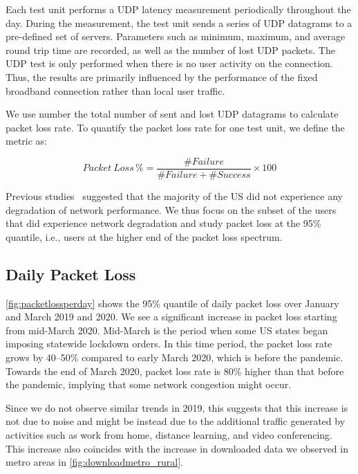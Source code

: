 Each test unit performs a \gls{UDP} latency measurement periodically throughout the day. During the measurement, the test unit sends a series of \gls{UDP} datagrams to a pre-defined set of servers. Parameters such as minimum, maximum, and average round  trip time are recorded, as well as the number of lost \gls{UDP} packets. The \gls{UDP} test is only performed when there is no user activity on the connection. Thus, the results are primarily influenced by the performance of the fixed broadband connection rather than local user traffic.

We use number the total number of sent and lost \gls{UDP} datagrams to calculate packet loss rate. To quantify the packet loss rate for one test unit, we define the metric as:

\begin{equation}
    Packet \ Loss\, \% = \frac{\#Failure }{\#Failure + \#Success} \times 100
\end{equation}

Previous studies~\cite{kovacs} suggested that the majority of the \gls{US} did not experience any degradation of network performance. We thus focus on the subset of the users that did experience network degradation and study packet loss at the 95\% quantile, i.e., users at the higher end of the packet loss spectrum.

\subsection{Daily Packet Loss}

\cref{fig:packetlossperday} shows the 95\% quantile of daily packet loss over January and March 2019 and 2020. We see a significant increase in packet loss starting from mid-March 2020. Mid-March is the period when some \gls{US} states began imposing statewide lockdown orders. In this time period, the packet loss rate grows by 40--50\% compared to early March 2020, which is before the pandemic. Towards the end of March 2020, packet loss rate is 80\% higher than that before the pandemic, implying that some network congestion might occur.

Since we do not observe similar trends in 2019, this suggests that this increase is not due to noise and might be instead due to the additional traffic generated by activities such as work from home, distance learning, and video conferencing. This increase also coincides with the increase in downloaded data we observed in metro areas in \cref{fig:downloadmetro_rural}.

